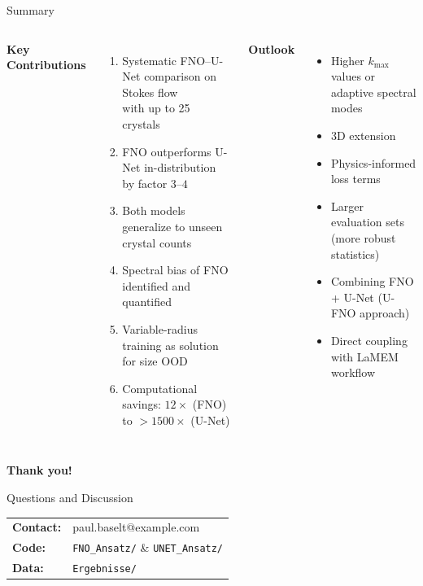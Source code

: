 \documentclass[aspectratio=169, 10pt]{beamer}
\begin{document}
\begin{frame}{Summary}
  \begin{columns}[T]
      \textbf{Key Contributions}
      \begin{enumerate}
        \item Systematic FNO–U-Net comparison on Stokes flow\\
          with up to 25 crystals
        \item FNO outperforms U-Net in-distribution by factor $3$–$4$
        \item Both models generalize to unseen crystal counts
        \item Spectral bias of FNO identified and quantified
        \item Variable-radius training as solution for size OOD
        \item Computational savings: $12\times$ (FNO) to $>1500\times$ (U-Net)
      \end{enumerate}

      \textbf{Outlook}
      \begin{itemize}
        \item Higher $k_\text{max}$ values or adaptive spectral modes
        \item 3D extension
        \item Physics-informed loss terms
        \item Larger evaluation sets (more robust statistics)
        \item Combining FNO + U-Net (U-FNO approach)
        \item Direct coupling with LaMEM workflow
      \end{itemize}
  \end{columns}
\end{frame}

\begin{frame}[plain]
  \begin{center}
    \Large\textbf{Thank you!}

    \vspace{1.5em}
    \normalsize Questions and Discussion

    \vspace{2em}
    \small
    \begin{tabular}{ll}
      \textbf{Contact:} & paul.baselt@example.com \\
      \textbf{Code:}    & \texttt{FNO\_Ansatz/} \& \texttt{UNET\_Ansatz/} \\
      \textbf{Data:}    & \texttt{Ergebnisse/} \\
    \end{tabular}
  \end{center}
\end{frame}
\end{document}
